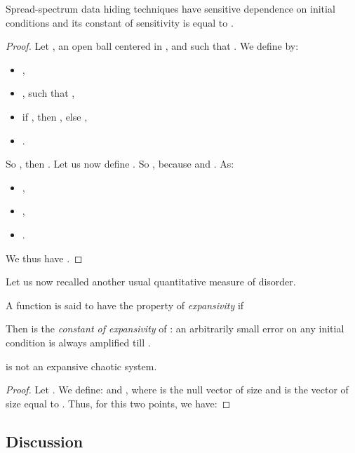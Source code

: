 \documentclass{llncs}
\begin{document}
\begin{proposition}
Spread-spectrum data hiding techniques  have sensitive dependence on initial conditions and its constant of sensitivity is equal to .
\end{proposition}




\begin{proof}
Let ,  an open ball centered in , and  such that .
We define  by:
\begin{itemize}
\item ,
\item ,  such that ,
\item if , then , else ,
\item .
\end{itemize} 

So  
, then . Let us now define . So , because  and . As:
\begin{itemize}
\item ,
\item ,
\item .
\end{itemize}

We thus have  
.
\end{proof}




Let us now recalled another usual quantitative measure of disorder.



\begin{definition}
A function  is said to have the property of \emph{expansivity} if

\end{definition}

Then  is the \emph{constant of expansivity} of : an arbitrarily small error on any initial condition is always amplified till .



\begin{proposition}
 is not an expansive chaotic system.
\end{proposition}

\begin{proof}
Let . We define:  and , where  is the null vector of size  and  is the vector of size  equal to . Thus, for this two points, we have:

\end{proof}



\subsection{Discussion}
\label{Discussion}
\end{document}
